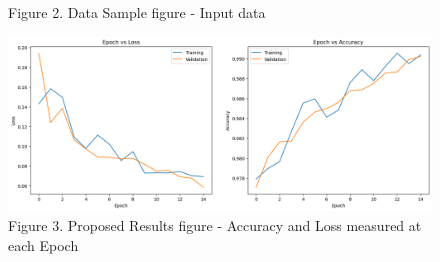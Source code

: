 \documentclass[acmtog]{acmart}
\begin{document}
\begin{minipage}{\textwidth}
\begin{subfigure}[h]{0.5\linewidth}
			Figure 2. Data Sample figure - Input data
		\end{subfigure}\vspace*{35}
		\begin{subfigure}[h]{\linewidth}
			\centering
			\includegraphics[scale=0.5]{Fig3.png} \\
			Figure 3. Proposed Results figure - Accuracy and Loss measured at each Epoch
		\end{subfigure}
	\end{minipage}
		
\end{document}
